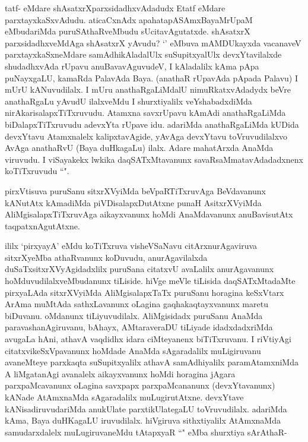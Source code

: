 
\begin{artha}
tatf- eMdare shAsatxrXparxsidadhxvAdadudx Etatf eMdare parxtayxkaSxvAdudu. aticaCxnAdx apahatapASAmx\s BayaMrUpaM eMbudariMda puruSAthaRveMbudu sUcitavAgutatxde. shAsatxrX parxsidadhxveMdAga shAsatxrX yAvudu?  `\stext ' eMbuva mAMDUkayxda vacanaveV parxtayxkaSxneMdare samAdhikAladalUlx suSupitxyalUlx devxYtavilalxde shudadhxvAda rUpavu anuBavavAguvudeV, I kAladalilx kAma pApa puNayxgaLU, kamaRda PalavAda Baya. (anathaR rUpavAda pApada Palavu) I mUrU kANuvudilalx. I mUru anathaRgaLiMdalU nimuRkatxvAdadydx beVre anathaRgaLu yAvudU ilalxveMdu I shurxtiyalilx veYshabadxdiMda nirAkarisalapxTiTxruvudu. Atamxna savxrUpavu kAmAdi anathaRgaLiMda biDalapxTiTxruvudu adevxYta rUpave idu. adariMda anathaRgaLiMda kUDida devxYtavu Atamxnalelx kalipxtavAgide, yAvAga devxYtavu toVruvudilalxvo AvAga anathaRvU (Baya duHkagaLu) ilalx. Adare mahatArxda AnaMda viruvudu. I viSayakekx lwkika daqSATxMtavanunx savaRsaMmatavAdadadxnenx koTiTxruvudu ``\stext ".
\end{artha}

\begin{artha}%
pirxVtisuva puruSanu sitxrXVyiMda beVpaRTiTxruvAga BeVdavanunx kANutAtx kAmadiMda piVDisalapxDutAtxne punaH AsitxrXVyiMda AliMgisalapxTiTxruvAga aikayxvanunx hoMdi AnaMdavanunx anuBavisutAtx taqpatxnAgutAtxne. 
\end{artha}

\begin{artha}
ililx `pirxyayA' eMdu koTiTxruva visheVSaNavu citArxnurAgaviruva sitxrXyeMba athaRvanunx koDuvudu, anurAgavilalxda duSaTxsitxrXVyAgidadxlilx puruSana citatxvU avaLalilx anurAgavanunx hoMduvudilalxveMbudanunx tiLiside. hiVge meVle tiLisida daqSATxMtadaMte pirxyaLAda sitxrXVyiMda AliMgisalapxTaTx puruSanu horagina keSxVtarx ArAma muMtAda sathxLavanunx oLagina gaqhakaqtayxvanunx maretu biDuvanu. oMdanunx tiLiyuvudilalx. AliMgisidadx puruSanu AnaMda paravashanAgiruvanu, bAhayx, AMtaraveraDU tiLiyade idadxdadxriMda avugaLa hAni, athavA vaqdidhx idara ciMteyanenx biTiTxruvanu. I riVtiyAgi citatxvikeSxVpavanunx hoMdade AnaMda sAgaradalilx muLigiruvanu avaneMteye parxkaqta suSupitxyalilx athavA samAdhiyalilx paramAtamxniMda A liMgatanAgi avanalelx aikayxvanunx hoMdi horagina jAgara parxpaMcavanunx oLagina savxpapx parxpaMcananunx (devxYtavanunx) kANade AtAmxnaMda sAgaradalilx muLugirutAtxne. devxYtave kANisadiruvudariMda anukUlate parxtikUlategaLU toVruvudilalx. adariMda kAma, Baya duHKagaLU iruvudilalx. hiVgiruva sithxtiyalilx AtAmxnaMda samudarxdalelx muLugiruvaneMdu tAtapxyaR ``\stext " eMba shurxtiya sArAthaR-
\end{artha}

